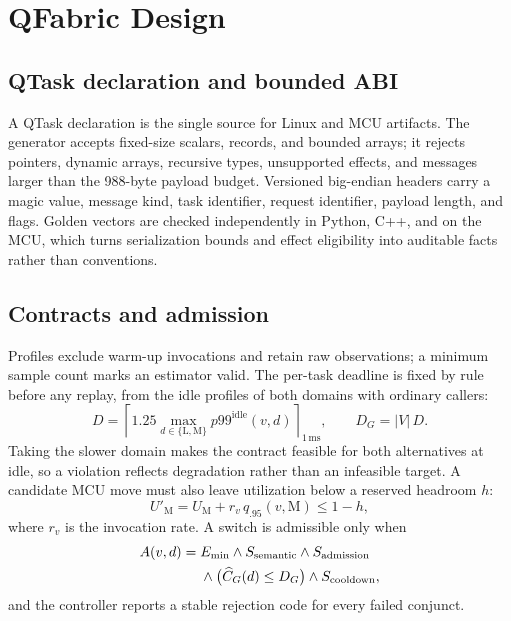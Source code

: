 \documentclass[conference]{IEEEtran}
\begin{document}
\section{QFabric Design}
\label{sec:design}
\subsection{QTask declaration and bounded ABI}
A QTask declaration is the single source for Linux and MCU artifacts. The
generator accepts fixed-size scalars, records, and bounded arrays; it rejects
pointers, dynamic arrays, recursive types, unsupported effects, and messages
larger than the 988-byte payload budget. Versioned big-endian headers carry a
magic value, message kind, task identifier, request identifier, payload
length, and flags. Golden vectors are checked independently in Python, C++,
and on the MCU, which turns serialization bounds and effect eligibility into
auditable facts rather than conventions.

\subsection{Contracts and admission}
Profiles exclude warm-up invocations and retain raw observations; a minimum
sample count marks an estimator valid. The per-task deadline is fixed by rule
before any replay, from the idle profiles of both domains with ordinary
callers:
\begin{equation}
  D=\left\lceil 1.25\max_{d\in\{\mathrm{L},\mathrm{M}\}}
  p99^{\mathrm{idle}}(v,d)\right\rceil_{1\,\mathrm{ms}},\qquad
  D_G=|V|\,D .
  \label{eq:deadline}
\end{equation}
Taking the slower domain makes the contract feasible for both alternatives at
idle, so a violation reflects degradation rather than an infeasible target.
A candidate MCU move must also leave utilization below a reserved headroom $h$:
\begin{equation}
  U'_{\mathrm{M}}=U_{\mathrm{M}}+r_v\,q_{.95}(v,\mathrm{M})\le 1-h,
  \label{eq:admission}
\end{equation}
where $r_v$ is the invocation rate. A switch is admissible only when
\begin{align}
  A(v,d)={}&E_{\min}\land S_{\mathrm{semantic}}\land
  S_{\mathrm{admission}} \notag\\
  &\land \bigl(\widehat{C}_G(d)\le D_G\bigr)\land S_{\mathrm{cooldown}},
  \label{eq:admissible}
\end{align}
and the controller reports a stable rejection code for every failed conjunct.
\end{document}
